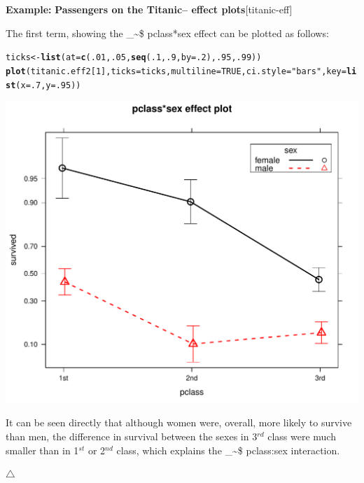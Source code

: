 \documentclass{article}
\makeatletter
\newcommand{\hlnum}[1]{\textcolor[rgb]{0.686,0.059,0.569}{#1}}%
\newcommand{\hlstr}[1]{\textcolor[rgb]{0.192,0.494,0.8}{#1}}%
\newcommand{\hlstd}[1]{\textcolor[rgb]{0.345,0.345,0.345}{#1}}%
\newcommand{\hlkwb}[1]{\textcolor[rgb]{0.69,0.353,0.396}{#1}}%
\newcommand{\hlkwc}[1]{\textcolor[rgb]{0.333,0.667,0.333}{#1}}%
\newcommand{\hlkwd}[1]{\textcolor[rgb]{0.737,0.353,0.396}{\textbf{#1}}}%
\newenvironment{kframe}{%
 \def\at@end@of@kframe{}%
 \ifinner\ifhmode%
  \def\at@end@of@kframe{\end{minipage}}%
  \begin{minipage}{\columnwidth}%
 \fi\fi%
 \def\FrameCommand##1{\hskip\@totalleftmargin \hskip-\fboxsep
 \colorbox{shadecolor}{##1}\hskip-\fboxsep
     \hskip-\linewidth \hskip-\@totalleftmargin \hskip\columnwidth}%
 \MakeFramed {\advance\hsize-\width
   \@totalleftmargin\z@ \linewidth\hsize
   \@setminipage}}%
 {\par\unskip\endMakeFramed%
 \at@end@of@kframe}
\newenvironment{knitrout}{}{} %
\newcommand\code{\bgroup\@makeother\_\@makeother\~\@makeother\$\@codex}
\def\@codex#1{{\normalfont\ttfamily\hyphenchar\font=-1 #1}\egroup}
\newenvironment{Example}[2][unnamed-example]%
  {\medskip\noindent\textbf{\textsf{Example:}}
   \textbf{#2}\hfill [#1]\par\smallskip
  }
  {\hfill $\triangle$}
\makeatother
\begin{document}
\begin{Example}[titanic-eff]{Passengers on the Titanic-- effect plots}
The first term, showing the \code{pclass*sex} effect can be plotted as follows:
\begin{knitrout}
\color{fgcolor}\begin{kframe}
\begin{alltt}
\hlstd{ticks} \hlkwb{<-} \hlkwd{list}\hlstd{(}\hlkwc{at}\hlstd{=}\hlkwd{c}\hlstd{(}\hlnum{.01}\hlstd{,} \hlnum{.05}\hlstd{,} \hlkwd{seq}\hlstd{(}\hlnum{.1}\hlstd{,} \hlnum{.9}\hlstd{,} \hlkwc{by}\hlstd{=}\hlnum{.2}\hlstd{),} \hlnum{.95}\hlstd{,} \hlnum{.99}\hlstd{))}
\hlkwd{plot}\hlstd{(titanic.eff2[}\hlnum{1}\hlstd{],} \hlkwc{ticks}\hlstd{=ticks,} \hlkwc{multiline}\hlstd{=}\hlnum{TRUE}\hlstd{,} \hlkwc{ci.style}\hlstd{=}\hlstr{"bars"}\hlstd{,} \hlkwc{key}\hlstd{=}\hlkwd{list}\hlstd{(}\hlkwc{x}\hlstd{=}\hlnum{.7}\hlstd{,} \hlkwc{y}\hlstd{=}\hlnum{.95}\hlstd{))}
\end{alltt}
\end{kframe}

{\centering \includegraphics[width=.5\linewidth]{figure/titanic-eff2-1-1} 

}



\end{knitrout}
It can be seen directly that although women were, overall, more likely to survive than
men, the difference in survival between the sexes in 3$^{rd}$ class were much smaller
than in 1$^{st}$ or 2$^{nd}$ class, which explains the \code{pclass:sex} interaction.


\end{Example}
\end{document}
